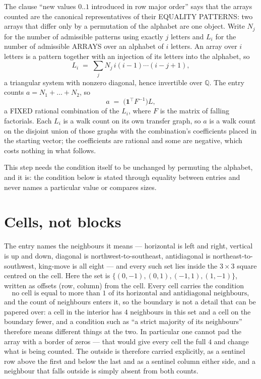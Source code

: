 \documentclass[11pt,a4paper]{article}
\theoremstyle{plain}
\theoremstyle{definition}
\begin{document}
The clause ``new values $0..1$ introduced in row major order'' says that the arrays
counted are the canonical representatives of their EQUALITY PATTERNS: two arrays that differ
only by a permutation of the alphabet are one object. Write $N_j$ for the number of admissible
patterns using exactly $j$ letters and $L_i$ for the number of admissible ARRAYS over an
alphabet of $i$ letters. An array over $i$ letters is a pattern together with an injection of
its letters into the alphabet, so
\[
L_i\;=\;\sum_{j}N_j\,i(i-1)\cdots(i-j+1),
\]
a triangular system with nonzero diagonal, hence invertible over $\mathbb{Q}$. The entry
counts $a=N_1+\dots+N_{2}$, so
\[
a\;=\;\bigl(\mathbf{1}^{\!\top}F^{-1}\bigr)L ,
\]
a FIXED rational combination of the $L_i$, where $F$ is the matrix of falling factorials.
Each $L_i$ is a walk count on its own transfer graph, so $a$ is a walk count on the disjoint
union of those graphs with the combination's coefficients placed in the starting vector; the
coefficients are rational and some are negative, which costs nothing in what follows.

This step needs the condition itself to be unchanged by permuting the alphabet, and it is:
the condition below is stated through equality between entries and never names a particular
value or compares sizes.

\section{Cells, not blocks}

The entry names the neighbours it means --- horizontal is left and right, vertical is up and
down, diagonal is northwest-to-southeast, antidiagonal is northeast-to-southwest, king-move is
all eight --- and every such set lies inside the $3\times3$ square centred on the cell. Here
the set is $\{(0,-1), (0,1), (-1,1), (1,-1)\}$, written as offsets (row, column) from the cell. Every cell carries
the condition
\[
\text{no cell is equal to more than 1 of its horizontal and antidiagonal neighbours},
\]
and the count of neighbours enters it, so the boundary is not a detail that can be papered
over: a cell in the interior has $4$ neighbours in this set and a cell on the boundary
fewer, and a condition such as ``a strict majority of its neighbours'' therefore means
different things at the two. In particular one cannot pad the array with a border of zeros ---
that would give every cell the full $4$ and change what is being counted. The outside is
therefore carried
explicitly, as a sentinel row above the first and below the last and as a sentinel column
either side, and a neighbour that falls outside is simply absent from both counts.
\end{document}
